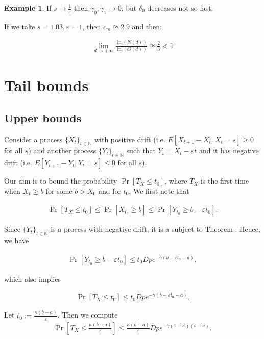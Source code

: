 \documentclass[12pt, a4paper]{article}
\theoremstyle{remark}
\theoremstyle{definition}
\newtheorem*{exmp}{Example}
\newcommand{\limd}{\lim\limits_{d \to +\infty}}
\begin{document}
\begin{exmp}
    If \(s \to \frac{1}{\varepsilon}\) then \(\gamma_0, \gamma_1 \to 0\), but \(\delta_0\) decreases not so fast.

    If we take \(s = 1.03, \varepsilon = 1\), then \(c_m \approxeq 2.9\) and then:

    \begin{align*}
        \limd \frac{\ln(N(d))}{\ln(G(d))} \approxeq \frac{2}{3} < 1
    \end{align*}

\end{exmp}





\section{Tail bounds}
\subsection{Upper bounds}
Consider a process $\{X_t\}_{t \in \mathbb{N}}$ with positive drift (i.e. $E[X_{t + 1} - X_t |\ X_t = s] \geq 0$ for all $s$) and another process $\{Y_t\}_{t \in \mathbb{N}}$ such that $Y_t = X_t - \varepsilon t$ and it has negative drift (i.e. $E[Y_{t + 1} - Y_t |\ Y_t = s] \leq 0$ for all $s$).

Our aim is to bound the probability $\Pr[T_X \leq t_0]$, where $T_X$ is the first time when $X_t \geq b$ for some $b > X_0$ and for $t_0$. We first note that

\begin{align*}
    \Pr[T_X \leq t_0] \leq \Pr[X_{t_0} \geq b] \leq \Pr[Y_{t_0} \geq b - \varepsilon t_0].
\end{align*}

Since $\{Y_t\}_{t \in \mathbb{N}}$ is a process with negative drift, it is a subject to Theorem \cite{}. Hence, we have

\begin{align*}
    \Pr[Y_{t_0} \geq b - \varepsilon t_0] \leq t_0 D p e^{-\gamma(b - \varepsilon t_0 - a)},
\end{align*}

which also implies

\begin{align*}
    \Pr[T_X \leq t_0] \leq t_0 D p e^{-\gamma(b - \varepsilon t_0 - a)}.
\end{align*}

Let $t_0 := \frac{\kappa (b - a)}{\varepsilon}$. Then we compute
\begin{align*}
    \Pr\left[T_X \leq \frac{\kappa (b - a)}{\varepsilon}\right] \leq \frac{\kappa (b - a)}{\varepsilon} D p e^{-\gamma(1 - \kappa)(b - a)}.
\end{align*}
\end{document}

